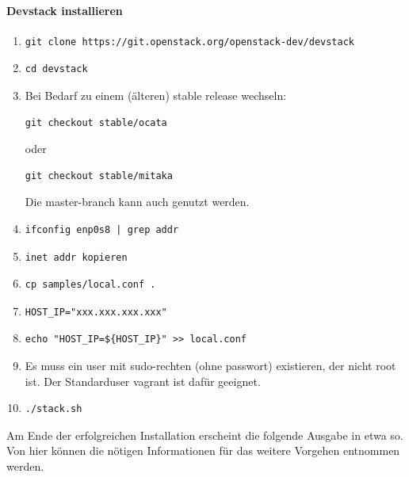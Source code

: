 \documentclass[a4paper,10pt]{article}
\begin{document}
\paragraph{Devstack installieren}
  
\begin{enumerate}
 \item \begin{verbatim}git clone https://git.openstack.org/openstack-dev/devstack \end{verbatim}
 \item  \begin{verbatim}cd devstack\end{verbatim}
 \item Bei Bedarf zu einem (älteren) stable release wechseln: \begin{verbatim}git checkout stable/ocata\end{verbatim} oder \begin{verbatim}git checkout stable/mitaka\end{verbatim} Die master-branch kann auch genutzt werden.
 \item \begin{verbatim}ifconfig enp0s8 | grep addr\end{verbatim}
 \item \begin{verbatim}inet addr kopieren\end{verbatim}
 \item \begin{verbatim}cp samples/local.conf .\end{verbatim}
 \item \begin{verbatim}HOST_IP="xxx.xxx.xxx.xxx"\end{verbatim}
 \item \begin{verbatim}echo "HOST_IP=${HOST_IP}" >> local.conf\end{verbatim}
 \item Es muss ein user mit sudo-rechten (ohne passwort) existieren, der nicht root ist. Der Standarduser vagrant ist dafür geeignet.
 \item \begin{verbatim}./stack.sh\end{verbatim}
\end{enumerate}

Am Ende der erfolgreichen Installation erscheint die folgende Ausgabe in etwa so.
Von hier können die nötigen Informationen für das weitere Vorgehen entnommen werden.
\end{document}
